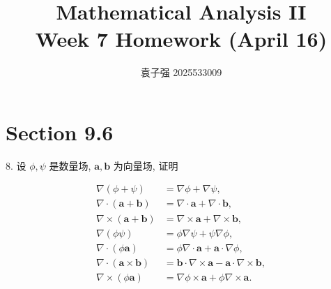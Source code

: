 \documentclass[a4paper,12pt]{article}
\title{Mathematical Analysis II\\Week 7 Homework (April 16)}
\author{袁子强\hspace{1cm} 2025533009}
\theoremstyle{definition}
\begin{document}
\maketitle

\section*{Section 9.6}

8. 设 $\phi, \psi$ 是数量场, $\boldsymbol{a}, \boldsymbol{b}$ 为向量场, 证明

\begin{align*}
    \nabla(\phi+\psi)
     & =\nabla\phi+\nabla\psi,                                                                       \\
    \nabla\cdot(\boldsymbol{a}+\boldsymbol{b})
     & =\nabla\cdot\boldsymbol{a}+\nabla\cdot\boldsymbol{b},                                         \\
    \nabla\times(\boldsymbol{a}+\boldsymbol{b})
     & =\nabla\times\boldsymbol{a}+\nabla\times\boldsymbol{b},                                       \\
    \nabla(\phi\psi)
     & =\phi\nabla\psi+\psi\nabla\phi,                                                               \\
    \nabla\cdot(\phi\boldsymbol{a})
     & =\phi\nabla\cdot\boldsymbol{a}+\boldsymbol{a}\cdot\nabla\phi,                                 \\
    \nabla\cdot(\boldsymbol{a}\times\boldsymbol{b})
     & =\boldsymbol{b}\cdot\nabla\times\boldsymbol{a}-\boldsymbol{a}\cdot\nabla\times\boldsymbol{b}, \\
    \nabla\times(\phi\boldsymbol{a})
     & =\nabla\phi\times\boldsymbol{a}+\phi\nabla\times\boldsymbol{a}.
\end{align*}
\end{document}
